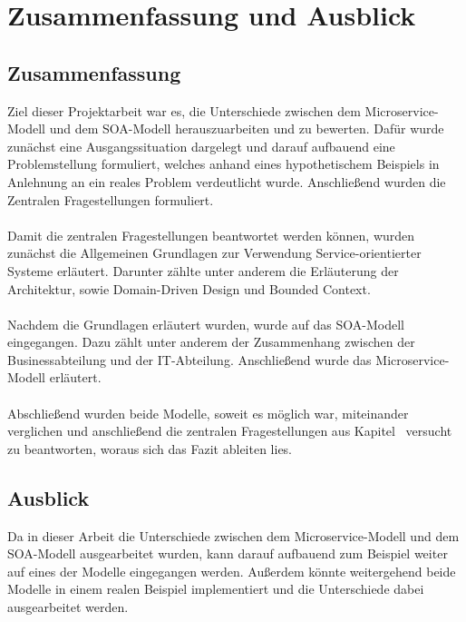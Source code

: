 \chapter{Zusammenfassung und Ausblick}
\label{chap:ZusammenfassungUndAusblick}

\section{Zusammenfassung}
\label{sec:Zusammenfassung}
Ziel dieser Projektarbeit war es, die Unterschiede zwischen dem Microservice-Modell und dem SOA-Modell herauszuarbeiten und zu bewerten. Dafür wurde zunächst eine Ausgangssituation dargelegt und darauf aufbauend eine Problemstellung formuliert, welches anhand eines hypothetischem Beispiels in Anlehnung an ein reales Problem verdeutlicht wurde. Anschließend wurden die Zentralen Fragestellungen formuliert.
\\\\
Damit die zentralen Fragestellungen beantwortet werden können, wurden zunächst die Allgemeinen Grundlagen zur Verwendung Service-orientierter Systeme erläutert. Darunter zählte unter anderem die Erläuterung der Architektur, sowie Domain-Driven Design und Bounded Context.
\\\\
Nachdem die Grundlagen erläutert wurden, wurde auf das SOA-Modell eingegangen. Dazu zählt unter anderem der Zusammenhang zwischen der Businessabteilung und der IT-Abteilung. Anschließend wurde das Microservice-Modell erläutert.
\\\\
Abschließend wurden beide Modelle, soweit es möglich war, miteinander verglichen und anschließend die zentralen Fragestellungen aus Kapitel \ versucht zu beantworten, woraus sich das Fazit ableiten lies.

\section{Ausblick}
\label{sec:Ausblick}
Da in dieser Arbeit die Unterschiede zwischen dem Microservice-Modell und dem SOA-Modell ausgearbeitet wurden, kann darauf aufbauend zum Beispiel weiter auf eines der Modelle eingegangen werden. Außerdem könnte weitergehend beide Modelle in einem realen Beispiel implementiert und die Unterschiede dabei ausgearbeitet werden.